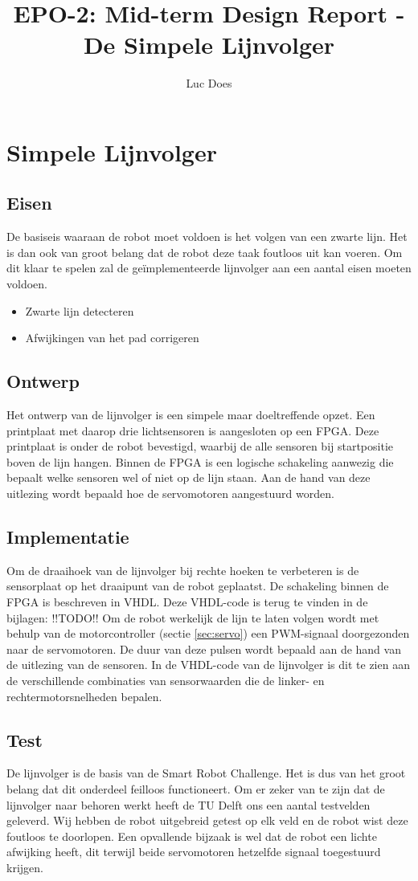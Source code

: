 \documentclass{report}
\title{EPO-2: Mid-term Design Report - De Simpele Lijnvolger}
\author{Luc Does}
\begin{document}
\chapter{Simpele Lijnvolger}
\label{ch:lijnvolger}

\section{Eisen}
De basiseis waaraan de robot moet voldoen is het volgen van een zwarte lijn. Het is dan ook van groot belang dat de robot deze taak foutloos uit kan voeren. Om dit klaar te spelen zal de geïmplementeerde lijnvolger aan een aantal eisen moeten voldoen.

\begin{itemize}
\item Zwarte lijn detecteren
\item Afwijkingen van het pad corrigeren
\end{itemize}

\section{Ontwerp}
Het ontwerp van de lijnvolger is een simpele maar doeltreffende opzet. Een printplaat met daarop drie lichtsensoren is aangesloten op een FPGA. Deze printplaat is onder de robot bevestigd, waarbij de alle sensoren bij startpositie boven de lijn hangen. Binnen de FPGA is een logische schakeling aanwezig die bepaalt welke sensoren wel of niet op de lijn staan. Aan de hand van deze uitlezing wordt bepaald hoe de servomotoren aangestuurd worden.

\section{Implementatie}
Om de draaihoek van de lijnvolger bij rechte hoeken te verbeteren is de sensorplaat op het draaipunt van de robot geplaatst. De schakeling binnen de FPGA is beschreven in VHDL. Deze VHDL-code is terug te vinden in de bijlagen: !!TODO!! Om de robot werkelijk de lijn te laten volgen wordt met behulp van de motorcontroller (sectie \ref{sec:servo}) een PWM-signaal doorgezonden naar de servomotoren. De duur van deze pulsen wordt bepaald aan de hand van de uitlezing van de sensoren. In de VHDL-code van de lijnvolger is dit te zien aan de verschillende combinaties van sensorwaarden die de linker- en rechtermotorsnelheden bepalen.

\section{Test}
De lijnvolger is de basis van de Smart Robot Challenge. Het is dus van het groot belang dat dit onderdeel feilloos functioneert. Om er zeker van te zijn dat de lijnvolger naar behoren werkt heeft de TU Delft ons een aantal testvelden geleverd. Wij hebben de robot uitgebreid getest op elk veld en de robot wist deze foutloos te doorlopen. Een opvallende bijzaak is wel dat de robot een lichte afwijking heeft, dit terwijl beide servomotoren hetzelfde signaal toegestuurd krijgen.
\end{document}
